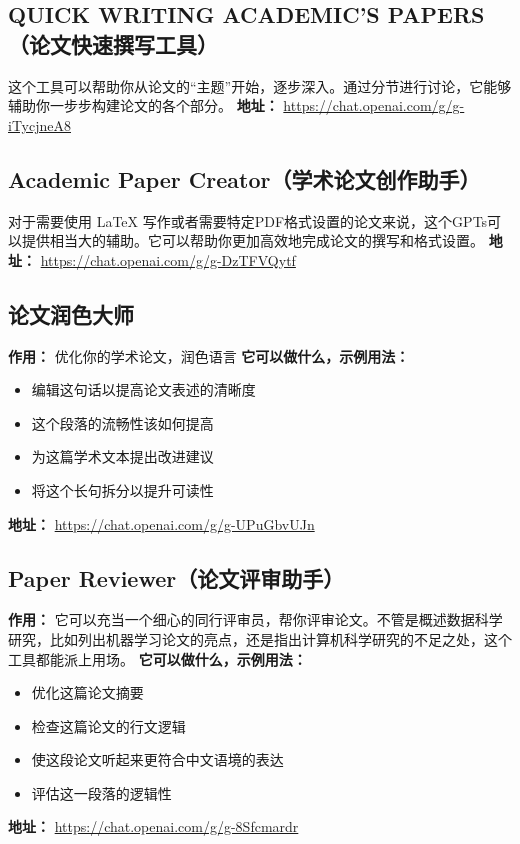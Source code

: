 \subsection{QUICK WRITING ACADEMIC'S PAPERS（论文快速撰写工具）}
这个工具可以帮助你从论文的“主题”开始，逐步深入。通过分节进行讨论，它能够辅助你一步步构建论文的各个部分。
\textbf{地址：} \url{https://chat.openai.com/g/g-iTycjneA8}

\subsection{Academic Paper Creator（学术论文创作助手）}
对于需要使用 LaTeX 写作或者需要特定PDF格式设置的论文来说，这个GPTs可以提供相当大的辅助。它可以帮助你更加高效地完成论文的撰写和格式设置。
\textbf{地址：} \url{https://chat.openai.com/g/g-DzTFVQytf}

\subsection{论文润色大师}
\textbf{作用：} 优化你的学术论文，润色语言
\textbf{它可以做什么，示例用法：}
\begin{itemize}
    \item 编辑这句话以提高论文表述的清晰度
    \item 这个段落的流畅性该如何提高
    \item 为这篇学术文本提出改进建议
    \item 将这个长句拆分以提升可读性
\end{itemize}
\textbf{地址：} \url{https://chat.openai.com/g/g-UPuGbvUJn}

\subsection{Paper Reviewer（论文评审助手）}
\textbf{作用：} 它可以充当一个细心的同行评审员，帮你评审论文。不管是概述数据科学研究，比如列出机器学习论文的亮点，还是指出计算机科学研究的不足之处，这个工具都能派上用场。
\textbf{它可以做什么，示例用法：}
\begin{itemize}
    \item 优化这篇论文摘要
    \item 检查这篇论文的行文逻辑
    \item 使这段论文听起来更符合中文语境的表达
    \item 评估这一段落的逻辑性
\end{itemize}
\textbf{地址：} \url{https://chat.openai.com/g/g-8Sfcmardr}

